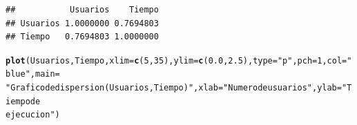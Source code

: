 \documentclass{article}\usepackage[]{graphicx}\usepackage[]{color}
\makeatletter
\newcommand{\hlnum}[1]{\textcolor[rgb]{0.686,0.059,0.569}{#1}}%
\newcommand{\hlstr}[1]{\textcolor[rgb]{0.192,0.494,0.8}{#1}}%
\newcommand{\hlstd}[1]{\textcolor[rgb]{0.345,0.345,0.345}{#1}}%
\newcommand{\hlkwc}[1]{\textcolor[rgb]{0.333,0.667,0.333}{#1}}%
\newcommand{\hlkwd}[1]{\textcolor[rgb]{0.737,0.353,0.396}{\textbf{#1}}}%
\newenvironment{kframe}{%
 \def\at@end@of@kframe{}%
 \ifinner\ifhmode%
  \def\at@end@of@kframe{\end{minipage}}%
  \begin{minipage}{\columnwidth}%
 \fi\fi%
 \def\FrameCommand##1{\hskip\@totalleftmargin \hskip-\fboxsep
 \colorbox{shadecolor}{##1}\hskip-\fboxsep
     \hskip-\linewidth \hskip-\@totalleftmargin \hskip\columnwidth}%
 \MakeFramed {\advance\hsize-\width
   \@totalleftmargin\z@ \linewidth\hsize
   \@setminipage}}%
 {\par\unskip\endMakeFramed%
 \at@end@of@kframe}
\newenvironment{knitrout}{}{} %
\makeatother
\begin{document}
\begin{knitrout}
\begin{kframe}
\begin{alltt}
\end{alltt}
\begin{verbatim}
##           Usuarios    Tiempo
## Usuarios 1.0000000 0.7694803
## Tiempo   0.7694803 1.0000000
\end{verbatim}
\begin{alltt}
\hlkwd{plot}\hlstd{(Usuarios, Tiempo,} \hlkwc{xlim}\hlstd{=} \hlkwd{c}\hlstd{(}\hlnum{5}\hlstd{,} \hlnum{35}\hlstd{),} \hlkwc{ylim}\hlstd{=} \hlkwd{c}\hlstd{(}\hlnum{0.0}\hlstd{,} \hlnum{2.5}\hlstd{),} \hlkwc{type} \hlstd{=} \hlstr{"p"}\hlstd{,} \hlkwc{pch}\hlstd{=}\hlnum{1}\hlstd{,} \hlkwc{col} \hlstd{=} \hlstr{"blue"}\hlstd{,} \hlkwc{main} \hlstd{=}
\hlstr{"Grafico de dispersion (Usuarios, Tiempo)"}\hlstd{,} \hlkwc{xlab}\hlstd{=}\hlstr{"Numero de usuarios"}\hlstd{,} \hlkwc{ylab}\hlstd{=}\hlstr{"Tiempo de
ejecucion"}\hlstd{)}


\end{alltt}
\end{kframe}
\end{knitrout}
\end{document}
